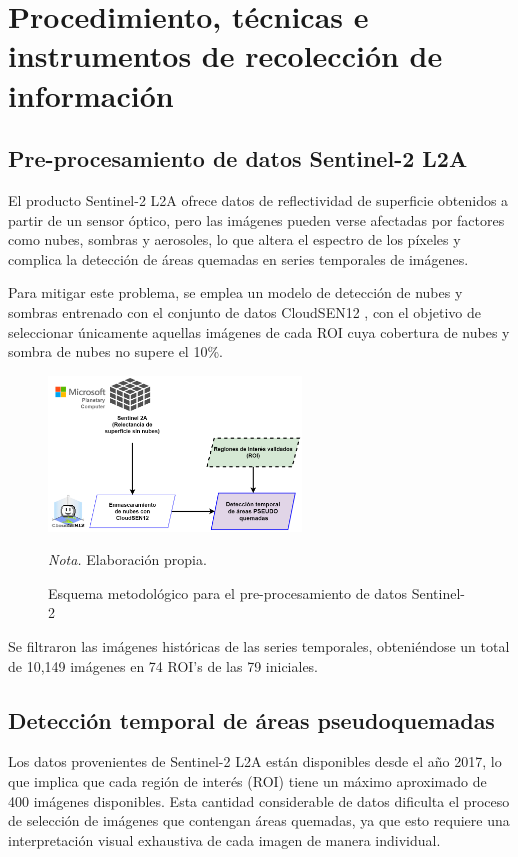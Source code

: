 \section{Procedimiento, técnicas e instrumentos de recolección de información}
\subsection{Pre-procesamiento de datos Sentinel-2 L2A}
El producto Sentinel-2 L2A ofrece datos de reflectividad de superficie obtenidos a partir de un sensor óptico, pero las imágenes pueden verse afectadas por factores como nubes, sombras y aerosoles, lo que altera el espectro de los píxeles y complica la detección de áreas quemadas en series temporales de imágenes.

Para mitigar este problema, se emplea un modelo de detección de nubes y sombras entrenado con el conjunto de datos CloudSEN12 \citep{aybar_cloudsen12_2022}, con el objetivo de seleccionar únicamente aquellas imágenes de cada ROI cuya cobertura de nubes y sombra de nubes no supere el 10\%.
\begin{figure}[H]
    \centering
    \caption{Esquema metodológico para el pre-procesamiento de datos Sentinel-2}
    \includegraphics[width=0.6\textwidth]{img/6_metodologia/preprocessimg.png}
    \label{fig:procesamientoimg}
    \begin{flushleft}
        \textit{Nota.} Elaboración propia.        
        \vspace{-\baselineskip}
    \end{flushleft}
\end{figure}

Se filtraron las imágenes históricas de las series temporales, obteniéndose un total de 10,149 imágenes en 74 ROI's de las 79 iniciales.

\subsection{Detección temporal de áreas pseudoquemadas}
Los datos provenientes de Sentinel-2 L2A están disponibles desde el año 2017, lo que implica que cada región de interés (ROI) tiene un máximo aproximado de 400 imágenes disponibles. Esta cantidad considerable de datos dificulta el proceso de selección de imágenes que contengan áreas quemadas, ya que esto requiere una interpretación visual exhaustiva de cada imagen de manera individual.

